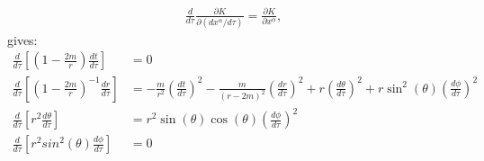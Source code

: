 \documentclass[a4paper]{article}
\begin{document}
\begin{align*}
\frac{d}{d\tau} \frac{\partial K}{\partial(dx^\alpha / d\tau)}  = \frac{\partial K}{\partial x^\alpha},
\end{align*}
gives:
\begin{align*}
	\frac{d}{d\tau} \left[ \left(1-\frac{2m}{r}\right) \frac{dt}{d\tau} \right] &= 0\\
	\frac{d}{d\tau} \left[ \left( 1- \frac{2m}{r}\right)^{-1} \frac{dr}{d\tau} \right] &=  -\frac{m}{r^2} \left(\frac{dt}{d\tau} \right)^2 - \frac{m}{(r-2m)^2}  \left(\frac{dr}{d\tau} \right)^2 + r  \left(\frac{d\theta}{d\tau} \right)^2  + r\sin^2(\theta)  \left(\frac{d\phi}{d\tau} \right)^2\\
	\frac{d}{d\tau} \left[ r^2 \frac{d\theta}{d\tau}  \right]  &= r^2 \sin(\theta)\cos(\theta) \left( \frac{d\phi}{d\tau} \right)^2 \\
	\frac{d}{d\tau} \left[r^2 sin^2(\theta) \frac{d\phi}{d\tau} \right] &= 0
\end{align*}
\end{document}
